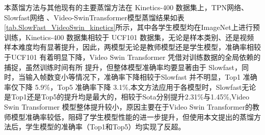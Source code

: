 \documentclass[10.5pt,letterpaper]{article}
\begin{document}
本蒸馏方法与其他现有的主要蒸馏方法在 Kinetics-400 \cite{kay-arXiv2017-kinetics}数据集上，TPN网络\cite{yang-cvpr2020-temporal}、Slowfast网络\cite{feichtenhofer-iccv2019-slowfast} 、Video-SwinTransformer\cite{liu-cvpr2022-video}模型蒸馏结果如表\ref{tab.SlowFast_VideoSwin_kinetics}所示，其中各学生模型均在ImageNet上进行预训练，Kinetics-400 数据集相较于 UCF101 数据集，无论是样本类别、还是视频样本难度均有显著提升，因此，两模型无论是教师模型还是学生模型，准确率相较于UCF101 有着明显下降，Video Swin Transformer 凭借对训练数据的全局依赖的捕捉，虽然训练时间有所
提升，但整体模型准确率均要显著由于 Slowfast，同时，当输入帧数变小等情况下，准确率下降相较于Slowfast 并不明显，Top1 准确率仅下降 5.9\%，Top5 准确率下降 3.1\%,本文方法应用于各模型时，Slowfast无论是Top1还是Top5的提升均是最大的，相较于Sota分别提升2.31\%与1.45\%,Video Swin Transformer 模型整体提升较小，原因主要在于Video Swin Transformer的教师模型准确率较低，阻碍了学生模型性能的进一步提升，但使用本文提出的蒸馏方法后，学生模型的准确率（Top1和Top5）均实现了反超。
\end{document}
